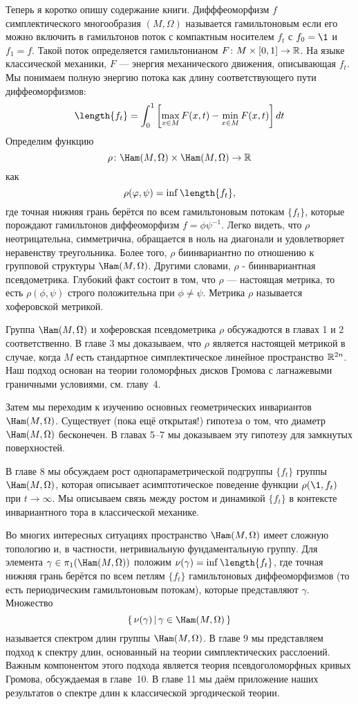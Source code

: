 Теперь я коротко опишу содержание книги.
Дифффеоморфизм $f$ симплектического многообразия $(M,\Omega)$ называется гамильтоновым если его можно включить в гамильтонов поток с компактным носителем $f_t$ с $f_0=\1$ и $f_1 =f$.
Такой поток определяется гамильтонианом $F\colon M \times [0, 1] \to \mathbb{R}$.
На языке классической механики, $F$ --- энергия механического движения, описывающая $f_t$.
Мы понимаем полную энергию потока как длину соответствующего пути диффеоморфизмов:
\[\length \{f_t\} =
\int_0^1\left[\max_{x\in M}F(x,t)-\min_{x\in M}F(x,t)\right] dt 
\]%
Определим функцию
\[\rho\: \Ham(M,\Omega) \times \Ham(M,\Omega) \to \RR\]
как
\[\rho (\phi, \psi) = \inf \length \{f_t\},\]
где точная нижняя грань берётся по всем гамильтоновым потокам $\{f_t\}$, которые
порождают гамильтонов диффеоморфизм $f = \phi\psi^{-1}$.
Легко видеть, что $\rho$ неотрицательна, симметрична, обращается в ноль на диагонали и удовлетворяет неравенству треугольника.
Более того, $\rho$ биинвариантно по отношению к групповой структуры $\Ham(M,\Omega)$.
Другими словами, $\rho$ - биинвариантная псевдометрика.
Глубокий факт состоит в том, что $\rho$ --- настоящая метрика, то есть $\rho (\phi, \psi)$ строго положительна при $\phi \ne \psi$.
Метрика $\rho$ называется хоферовской метрикой.

Группа $\Ham(M,\Omega)$ и хоферовская псевдометрика $\rho$ обсужадются в главах 1 и 2 соответственно.
В главе 3 мы доказываем, что $\rho$ является настоящей метрикой в случае, когда $M$ есть стандартное симплектическое линейное пространство $\mathbb{R}^{2n}$.
Наш подход основан на теории голоморфных дисков Громова с лагнажевыми граничными условиями, см.
главу~4.

Затем мы переходим к изучению основных геометрических инвариантов $\Ham(M,\Omega)$.
Существует (пока ещё открытая!) гипотеза о том, что диаметр $\Ham(M,\Omega)$ бесконечен.
В главах 5--7 мы доказываем эту гипотезу для замкнутых поверхностей.

В главе 8 мы обсуждаем рост однопараметрической подгруппы $\{f_t\}$ группы $\Ham(M,\Omega)$, которая описывает асимптотическое поведение функции $\rho (\1, f_t)$ при $t \to \infty$.
Мы описываем связь между ростом и динамикой $\{f_t\}$ в контексте инвариантного тора в классической механике.

Во многих интересных ситуациях пространство $\Ham(M,\Omega)$ имеет сложную топологию и, в частности, нетривиальную фундаментальную группу.
Для элемента $\gamma\in\pi_1(\Ham(M,\Omega))$ положим $\nu(\gamma) \z= \inf \length \{f_t\}$, где
точная нижняя грань берётся по всем петлям $\{f_t\}$ гамильтоновых диффеоморфизмов (то есть периодическим гамильтоновым потокам), которые представляют $\gamma$.
Множество
\[\set{\nu(\gamma)}{\gamma\in\Ham(M,\Omega)}\]
называется спектром длин группы $\Ham(M,\Omega)$.
В главе 9 мы представляем подход к спектру длин, основанный на теории симплектических расслоений.
Важным компонентом этого подхода является теория псевдоголоморфных кривых Громова, обсуждаемая в главе~10.
В главе 11 мы даём приложение наших результатов о спектре длин к классической эргодической теории.

